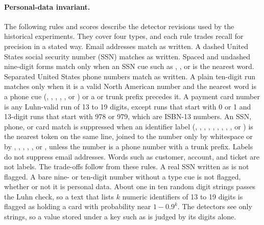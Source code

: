 \paragraph{Personal-data invariant.} The following rules and scores describe the detector revisions used by the historical experiments. They cover four types, and each rule trades recall for precision in a stated way. Email addresses match as written. A dashed United States social security number (SSN) matches as written. Spaced and undashed nine-digit forms match only when an SSN cue such as , , or  is the nearest word. Separated United States phone numbers match as written. A plain ten-digit run matches only when it is a valid North American number and the nearest word is a phone cue (, , , , , or ) or a  or  trunk prefix precedes it. A payment card number is any Luhn-valid run of 13 to 19 digits, except runs that start with 0 or 1 and 13-digit runs that start with 978 or 979, which are ISBN-13 numbers. An SSN, phone, or card match is suppressed when an identifier label (, , , , , , , , , or ) is the nearest token on the same line, joined to the number only by whitespace or by \code{:}, \code{\#}, \code{=}, , , or , unless the number is a phone number with a trunk prefix. Labels do not suppress email addresses. Words such as customer, account, and ticket are not labels. The trade-offs follow from these rules. A real SSN written as  is not flagged. A bare nine- or ten-digit number without a type cue is not flagged, whether or not it is personal data. About one in ten random digit strings passes the Luhn check, so a text that lists $k$ numeric identifiers of 13 to 19 digits is flagged as holding a card with probability near $1-0.9^{k}$. The detectors see only strings, so a value stored under a key such as  is judged by its digits alone.

